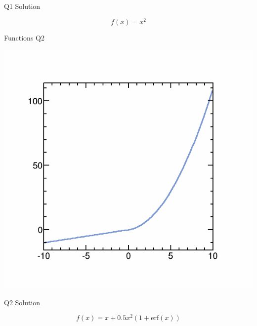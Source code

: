 \documentclass{beamer}
\begin{document}
\begin{frame}{Q1 Solution}

\[
f(x) = x^{2}
\]

\end{frame}


\begin{frame}{Functions Q2}
\begin{center}
\includegraphics[scale=0.3]{pics/wk3/q2.png}
\end{center}
\end{frame}


\begin{frame}{Q2 Solution}

\[
f(x) = x + 0.5x^{2}(1+\textrm{erf}(x))
\]

\end{frame}
\end{document}
